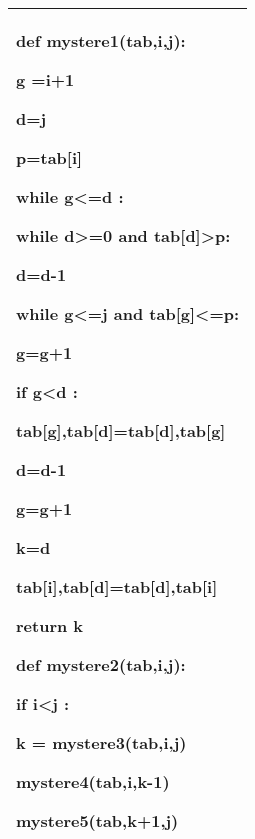 \documentclass[10pt,fleqn]{article} %
\begin{document}
\newpage 


\subparagraph{}  
\begin{center}
\begin{tabular}{|p{.95\linewidth}|}
\hline
\begin{python}
def mystere1(tab,i,j):

    g =i+1
    
    d=j
    
    p=tab[i]
    
    while g<=d :
    
        while d>=0 and tab[d]>p:
        
            d=d-1
            
        while g<=j and tab[g]<=p:
        
            g=g+1
            
        if g<d :
        
            tab[g],tab[d]=tab[d],tab[g]
            
            d=d-1
            
            g=g+1
            
    k=d
    
    tab[i],tab[d]=tab[d],tab[i]
    
    return k
    
    
def mystere2(tab,i,j):

    if i<j :
    
        k = mystere3(tab,i,j)
        
        mystere4(tab,i,k-1)
        
        mystere5(tab,k+1,j)
\end{python}
\vspace{.5cm} \\
\hline
\end{tabular}
\end{center}


\subparagraph{} 
\begin{center}
\begin{tabular}{|p{.95\linewidth}|}
\hline
\vspace{.5cm}
\dotfill


\vspace{1cm}
\dotfill

\vspace{1cm}
\dotfill

\vspace{1cm}
\dotfill

\vspace{1cm}
\dotfill

\vspace{.5cm} \\
\hline
\end{tabular}
\end{center}
\end{document}
